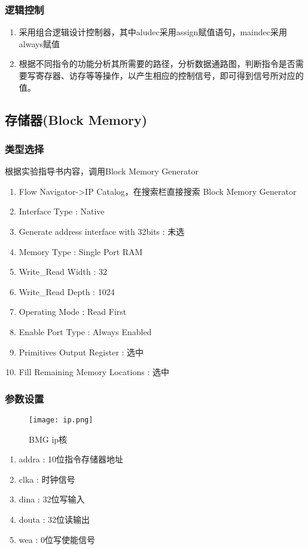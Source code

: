 \subsubsection{逻辑控制}
\begin{enumerate}
\item 采用组合逻辑设计控制器，其中aludec采用assign赋值语句，maindec采用always赋值
\item 根据不同指令的功能分析其所需要的路径，分析数据通路图，判断指令是否需要写寄存器、访存等等操作，以产生相应的控制信号，即可得到信号所对应的值。
\end{enumerate}

\subsection{存储器(Block Memory)}\label{sub:ctl}

\subsubsection{类型选择}
根据实验指导书内容，调用Block Memory Generator
\begin{enumerate}
    \item Flow Navigator->IP Catalog，在搜索栏直接搜索 Block Memory Generator
    \item Interface Type : Native
    \item Generate address interface with 32bits : 未选
    \item Memory Type : Single Port RAM
    \item Write\_Read Width : 32
    \item Write\_Read Depth : 1024
    \item Operating Mode : Read First
    \item Enable Port Type : Always Enabled
    \item Primitives Output Register : 选中
    \item Fill Remaining Memory Locations : 选中
\end{enumerate}

\subsubsection{参数设置}

\begin{figure}[htbp]
    \centering
    \texttt{[image: ip.png]}
    \caption{BMG ip核}
\end{figure}

\begin{enumerate}
    \item addra : 10位指令存储器地址
    \item clka  : 时钟信号
    \item dina  : 32位写输入
    \item douta : 32位读输出
    \item wea   : 0位写使能信号
\end{enumerate}
